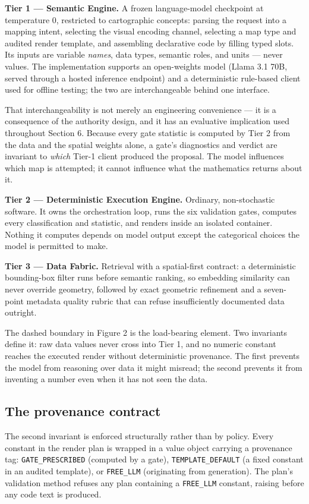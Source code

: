 \textbf{Tier 1 --- Semantic Engine.} A frozen language-model checkpoint at temperature 0, restricted to cartographic concepts: parsing the request into a mapping intent, selecting the visual encoding channel, selecting a map type and audited render template, and assembling declarative code by filling typed slots. Its inputs are variable \emph{names}, data types, semantic roles, and units --- never values. The implementation supports an open-weights model (Llama 3.1 70B, served through a hosted inference endpoint) and a deterministic rule-based client used for offline testing; the two are interchangeable behind one interface.

That interchangeability is not merely an engineering convenience --- it is a consequence of the authority design, and it has an evaluative implication used throughout Section 6. Because every gate statistic is computed by Tier 2 from the data and the spatial weights alone, a gate's diagnostics and verdict are invariant to \emph{which} Tier-1 client produced the proposal. The model influences which map is attempted; it cannot influence what the mathematics returns about it.

\textbf{Tier 2 --- Deterministic Execution Engine.} Ordinary, non-stochastic software. It owns the orchestration loop, runs the six validation gates, computes every classification and statistic, and renders inside an isolated container. Nothing it computes depends on model output except the categorical choices the model is permitted to make.

\textbf{Tier 3 --- Data Fabric.} Retrieval with a spatial-first contract: a deterministic bounding-box filter runs before semantic ranking, so embedding similarity can never override geometry, followed by exact geometric refinement and a seven-point metadata quality rubric that can refuse insufficiently documented data outright.

The dashed boundary in Figure 2 is the load-bearing element. Two invariants define it: raw data values never cross into Tier 1, and no numeric constant reaches the executed render without deterministic provenance. The first prevents the model from reasoning over data it might misread; the second prevents it from inventing a number even when it has not seen the data.

\subsection{The provenance contract}
The second invariant is enforced structurally rather than by policy. Every constant in the render plan is wrapped in a value object carrying a provenance tag: \texttt{GATE\_PRESCRIBED} (computed by a gate), \texttt{TEMPLATE\_DEFAULT} (a fixed constant in an audited template), or \texttt{FREE\_LLM} (originating from generation). The plan's validation method refuses any plan containing a \texttt{FREE\_LLM} constant, raising before any code text is produced.

